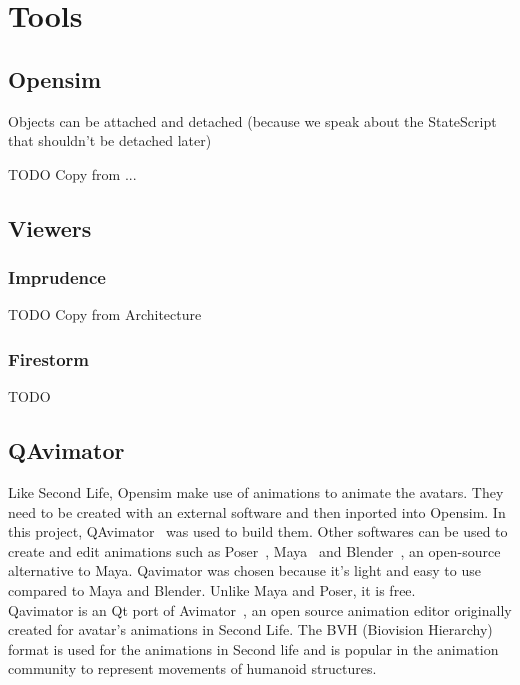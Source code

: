 \section{Tools}
\label{sec:devtools}

\subsection{Opensim}
Objects can be attached and detached (because we speak about the StateScript that shouldn't be detached later)

TODO Copy from ...
\subsection{Viewers}
\subsubsection{Imprudence}
TODO Copy from Architecture 
\subsubsection{Firestorm}
TODO
\cite{firestormWebsite}


\subsection{QAvimator}

Like Second Life, Opensim make use of animations to animate the avatars. They need to be created with an external software and then inported into Opensim.
In this project, QAvimator~\cite{qavimatorWebsite} was used to build them. Other softwares can be used to create and edit animations such as Poser~\cite{PoserWebsite}, Maya~\cite{mayaWebsite} and Blender~\cite{BlenderWebsite}, an open-source alternative to Maya. Qavimator was chosen because it's light and easy to use compared to Maya and Blender. Unlike Maya and Poser, it is free.\\

Qavimator is an Qt port of Avimator~\cite{avimatorWebsite}, an open source animation editor originally created for avatar's animations in Second Life. The BVH (Biovision Hierarchy)~\cite{thingvold1999biovision} format is used for the animations in Second life and is popular in the animation community to represent movements of humanoid structures. \\

